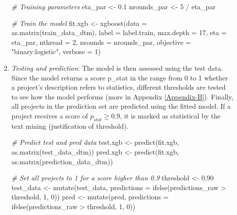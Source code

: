 \documentclass[
]{article}
\newenvironment{Shaded}{\begin{snugshade}}{\end{snugshade}}
\newcommand{\AttributeTok}[1]{\textcolor[rgb]{0.77,0.63,0.00}{#1}}
\newcommand{\CommentTok}[1]{\textcolor[rgb]{0.56,0.35,0.01}{\textit{#1}}}
\newcommand{\DecValTok}[1]{\textcolor[rgb]{0.00,0.00,0.81}{#1}}
\newcommand{\FloatTok}[1]{\textcolor[rgb]{0.00,0.00,0.81}{#1}}
\newcommand{\FunctionTok}[1]{\textcolor[rgb]{0.00,0.00,0.00}{#1}}
\newcommand{\NormalTok}[1]{#1}
\newcommand{\OtherTok}[1]{\textcolor[rgb]{0.56,0.35,0.01}{#1}}
\newcommand{\SpecialCharTok}[1]{\textcolor[rgb]{0.00,0.00,0.00}{#1}}
\newcommand{\StringTok}[1]{\textcolor[rgb]{0.31,0.60,0.02}{#1}}
\begin{document}
\begin{enumerate}
\begin{enumerate}
\begin{Shaded}
\begin{Highlighting}[]
\CommentTok{\# Training parameters}
\NormalTok{eta\_par }\OtherTok{\textless{}{-}} \FloatTok{0.1}
\NormalTok{nrounds\_par }\OtherTok{\textless{}{-}} \DecValTok{5} \SpecialCharTok{/}\NormalTok{ eta\_par}

\CommentTok{\# Train the model}
\NormalTok{fit.xgb }\OtherTok{\textless{}{-}} \FunctionTok{xgboost}\NormalTok{(}\AttributeTok{data =} \FunctionTok{as.matrix}\NormalTok{(train\_data\_dtm), }\AttributeTok{label =}\NormalTok{ label.train, }\AttributeTok{max.depth =} \DecValTok{17}\NormalTok{, }\AttributeTok{eta =}\NormalTok{ eta\_par, }\AttributeTok{nthread =} \DecValTok{2}\NormalTok{, }
                   \AttributeTok{nrounds =}\NormalTok{ nrounds\_par, }\AttributeTok{objective =} \StringTok{"binary:logistic"}\NormalTok{, }\AttributeTok{verbose =} \DecValTok{1}\NormalTok{)}
\end{Highlighting}
\end{Shaded}
  \item
    \emph{Testing and prediction}: The model is then assessed using the test data. Since the model returns a score p\_stat in the range from 0 to 1 whether a project's description refers to statistics, different thresholds are tested to see how the model performs (more in Appendix \ref{Appendix-B}). Finally, all projects in the prediction set are predicted using the fitted model. If a project receives a score of \(p_{stat} \geq 0.9\), it is marked as statistical by the text mining (justification of threshold).

\begin{Shaded}
\begin{Highlighting}[]
\CommentTok{\# Predict test and pred data}
\NormalTok{test.xgb }\OtherTok{\textless{}{-}} \FunctionTok{predict}\NormalTok{(fit.xgb, }\FunctionTok{as.matrix}\NormalTok{(test\_data\_dtm))}
\NormalTok{pred.xgb }\OtherTok{\textless{}{-}} \FunctionTok{predict}\NormalTok{(fit.xgb, }\FunctionTok{as.matrix}\NormalTok{(prediction\_data\_dtm))}

\CommentTok{\# Set all projects to 1 for a score higher than 0.9}
\NormalTok{threshold }\OtherTok{\textless{}{-}} \FloatTok{0.90}
\NormalTok{test\_data }\OtherTok{\textless{}{-}} \FunctionTok{mutate}\NormalTok{(test\_data, }\AttributeTok{predictions =} \FunctionTok{ifelse}\NormalTok{(predictions\_raw }\SpecialCharTok{\textgreater{}}\NormalTok{ threshold, }\DecValTok{1}\NormalTok{, }\DecValTok{0}\NormalTok{))}
\NormalTok{pred }\OtherTok{\textless{}{-}} \FunctionTok{mutate}\NormalTok{(pred, }\AttributeTok{predictions =} \FunctionTok{ifelse}\NormalTok{(predictions\_raw }\SpecialCharTok{\textgreater{}}\NormalTok{ threshold, }\DecValTok{1}\NormalTok{, }\DecValTok{0}\NormalTok{))}


\end{Highlighting}
\end{Shaded}
\end{enumerate}
\end{enumerate}
\end{document}
